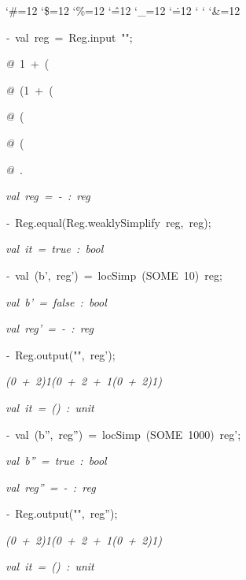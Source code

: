 \begin{list}{}
{\setlength{\leftmargin}{\leftmargini}
\setlength{\rightmargin}{0cm}
\setlength{\itemindent}{0cm}
\setlength{\listparindent}{0cm}
\setlength{\itemsep}{0cm}
\setlength{\parsep}{0cm}
\setlength{\labelsep}{0cm}
\setlength{\labelwidth}{0cm}
\catcode`\#=12
\catcode`\$=12
\catcode`\%=12
\catcode`\^=12
\catcode`\_=12
\catcode`\.=12
\catcode`
\catcode`
\catcode`\&=12
\ttfamily}
\small
\item[]\textsl{-\ }val\ reg\ =\ Reg.input\ "";
\item[]\textsl{@\ }1\ +\ (%
\item[]\textsl{@\ }(1\ +\ (%
\item[]\textsl{@\ }(%
\item[]\textsl{@\ }(%
\item[]\textsl{@\ }.
\item[]\textsl{val\ reg\ =\ -\ :\ reg}
\item[]\textsl{-\ }Reg.equal(Reg.weaklySimplify\ reg,\ reg);
\item[]\textsl{val\ it\ =\ true\ :\ bool}
\item[]\textsl{-\ }val\ (b',\ reg')\ =\ locSimp\ (SOME\ 10)\ reg;
\item[]\textsl{val\ b'\ =\ false\ :\ bool}
\item[]\textsl{val\ reg'\ =\ -\ :\ reg}
\item[]\textsl{-\ }Reg.output("",\ reg');
\item[]\textsl{(0\ +\ 2)1(0\ +\ 2\ +\ 1(0\ +\ 2)1)}
\item[]\textsl{val\ it\ =\ ()\ :\ unit}
\item[]\textsl{-\ }val\ (b'',\ reg'')\ =\ locSimp\ (SOME\ 1000)\ reg';
\item[]\textsl{val\ b''\ =\ true\ :\ bool}
\item[]\textsl{val\ reg''\ =\ -\ :\ reg}
\item[]\textsl{-\ }Reg.output("",\ reg'');
\item[]\textsl{(0\ +\ 2)1(0\ +\ 2\ +\ 1(0\ +\ 2)1)}
\item[]\textsl{val\ it\ =\ ()\ :\ unit}
\end{list}

